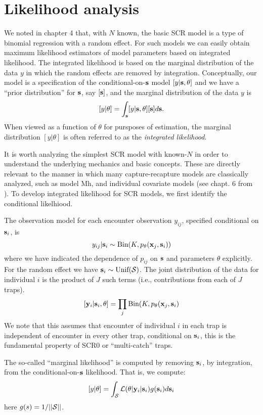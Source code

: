 \section{Likelihood analysis }

We noted in chapter 4 that, with $N$ known, the basic SCR model is a
type of binomial regression with a random effect. For such models we
can easily obtain maximum likelihood estimators of model parameters
based on integrated likelihood. The integrated likelihood is based on
the marginal distribution of the data $y$ in which the random effects
are removed by integration. Conceptually, our model is a specification
of the conditional-on-${\bf s}$ model $[y|{\bf s},\theta]$ and we have
a ``prior distribution'' for ${\bf s}$, say $[{\bf s}]$, and the
marginal distribution of the data $y$ is
\[
[y|\theta] =  \int_{\bf s} [y|{\bf s},\theta][{\bf s}] d{\bf s}.
\]
When viewed as a function of $\theta$ for pursposes of estimation, the
marginal distribution $[y|\theta]$ is often referred to as the {\it
  integrated likelihood}.

It is worth analyzing 
the simplest SCR model with known-$N$ in order to understand the
underlying mechanics and basic concepts. These are directly relevant to
the manner in which many capture-recapture models are classically
analyzed, such as model Mh, and individual covariate models (see
chapt. 6 from \citet{royle_dorazio:2008}). To develop integrated
likelihood for SCR models, we first identify the conditional
likelhiood. 

The observation model for each encounter observation $y_{ij}$,
specified conditional on ${\bf s}_{i}$, is 
\begin{equation}
	y_{ij}| {\bf s}_{i} \sim \mbox{Bin}(K, p_{\theta}({\bf x}_{j},{\bf s}_{i}))
\label{mle.eq.cond-on-s}
\end{equation}
where we have indicated the dependence of $p_{ij}$ on ${\bf s}$ and
parameters $\theta$
explicitly.
For the random effect we have ${\bf s}_{i} \sim  \mbox{Unif}({\cal
  S})$.
The joint distribution of the data for individual $i$ is the product
of $J$ such terms (i.e., contributions from each of $J$ traps).
\[
  [{\bf y}_{i} | {\bf s}_{i} , \theta] = 
  \prod_{j} \mbox{Bin}(K, p_{\theta}({\bf x}_{j},{\bf s}_{i})
\]
We note that this assumes that encounter of individual $i$ in each
trap is independent of encounter in every other trap, conditional on
${\bf s}_{i}$, this is the fundamental property of SCR0 or
``multi-catch'' traps. 

 The so-called ``marginal likelihood'' is computed by removing
${\bf s}_{i}$, by integration, from the conditional-on-${\bf s}$ likelihood. That
is, we compute:
\[
  [y|\theta] = 
\int_{{\cal S}} {\cal L}( \theta | {\bf y}_{i} |{\bf s}_{i}) g({\bf s}_{i}) d{\bf s}_{i}
\]
here $g(s) = 1/||{\cal S}||$.

